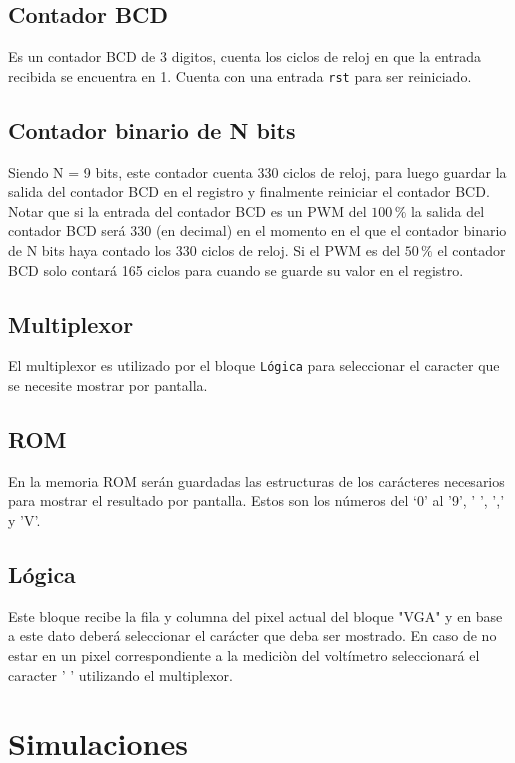 \documentclass[10pt,spanish,a4paper,openany,notitlepage]{article}
\begin{document}
\subsection{Contador BCD}

Es un contador BCD de 3 digitos, cuenta los ciclos de reloj en que
la entrada recibida se encuentra en 1.
Cuenta con una entrada \texttt{rst} para ser reiniciado.

\subsection{Contador binario de N bits}

Siendo N = 9 bits, este contador cuenta 330 ciclos de reloj, para luego
guardar la salida del contador BCD en el registro y finalmente reiniciar
el contador BCD.
Notar que si la entrada del contador BCD es un PWM del $100\,\unit{\%}$
la salida del contador BCD será 330 (en decimal) en el momento en el que
el contador binario de N bits haya contado los 330 ciclos de reloj.
Si el PWM es del $50\,\unit{\%}$ el contador BCD solo contará 165 ciclos
para cuando se guarde su valor en el registro.

\subsection{Multiplexor}

El multiplexor es utilizado por el bloque \texttt{Lógica} para seleccionar
el caracter que se necesite mostrar por pantalla.

\subsection{ROM}

En la memoria ROM serán guardadas las estructuras de los carácteres
necesarios para mostrar el resultado por pantalla. Estos son los números
del `0' al '9', ' ', ',' y 'V'.

\subsection{Lógica}

Este bloque recibe la fila y columna del pixel actual del bloque "VGA"
y en base a este dato deberá seleccionar el carácter que deba ser mostrado.
En caso de no estar en un pixel correspondiente a la mediciòn del voltímetro
seleccionará el caracter ' ' utilizando el multiplexor.

\section{Simulaciones}
\end{document}
